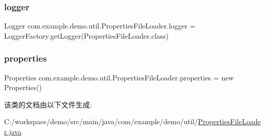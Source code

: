 \subsubsection{\texorpdfstring{logger}{logger}}
{\footnotesize\ttfamily Logger com.\+example.\+demo.\+util.\+Properties\+File\+Loader.\+logger = Logger\+Factory.\+get\+Logger(Properties\+File\+Loader.\+class)\hspace{0.3cm}{\ttfamily [private]}}

\mbox{\label{classcom_1_1example_1_1demo_1_1util_1_1_properties_file_loader_a76002c6164ddd89110636049267a77dc}} 
\subsubsection{\texorpdfstring{properties}{properties}}
{\footnotesize\ttfamily Properties com.\+example.\+demo.\+util.\+Properties\+File\+Loader.\+properties = new Properties()\hspace{0.3cm}{\ttfamily [private]}}



该类的文档由以下文件生成\+:\begin{DoxyCompactItemize}
\item 
C\+:/workspace/demo/src/main/java/com/example/demo/util/\mbox{\hyperlink{_properties_file_loader_8java}{Properties\+File\+Loader.\+java}}\end{DoxyCompactItemize}
